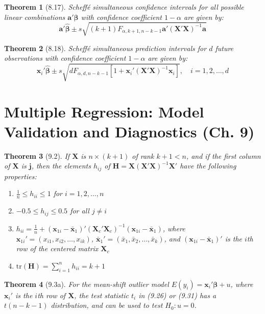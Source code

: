 \documentclass{article}
\newtheorem{theorem}{Theorem}[section]
\begin{document}
\begin{theorem}[8.17]
Scheffé simultaneous confidence intervals for all possible linear combinations $\mathbf{a}'\boldsymbol{\beta}$ with confidence coefficient $1-\alpha$ are given by:
\[\mathbf{a}'\hat{\boldsymbol{\beta}} \pm s\sqrt{(k+1)F_{\alpha,k+1,n-k-1}\mathbf{a}'(\mathbf{X}'\mathbf{X})^{-1}\mathbf{a}}\]
\end{theorem}

\begin{theorem}[8.18]
Scheffé simultaneous prediction intervals for $d$ future observations with confidence coefficient $1-\alpha$ are given by:
\[\mathbf{x}_i'\hat{\boldsymbol{\beta}} \pm s\sqrt{dF_{\alpha,d,n-k-1}[1 + \mathbf{x}_i'(\mathbf{X}'\mathbf{X})^{-1}\mathbf{x}_i]}, \quad i=1,2,\ldots,d\]
\end{theorem}

\section{Multiple Regression: Model Validation and Diagnostics (Ch. 9)}

\begin{theorem}[9.2]
If $\mathbf{X}$ is $n \times (k+1)$ of rank $k+1 < n$, and if the first column of $\mathbf{X}$ is $\mathbf{j}$, then the elements $h_{ij}$ of $\mathbf{H} = \mathbf{X}(\mathbf{X}'\mathbf{X})^{-1}\mathbf{X}'$ have the following properties:

\begin{enumerate}[label=(\roman*)]
\item $\frac{1}{n} \leq h_{ii} \leq 1$ for $i = 1,2,\ldots,n$
\item $-0.5 \leq h_{ij} \leq 0.5$ for all $j \neq i$
\item $h_{ii} = \frac{1}{n} + (\mathbf{x}_{1i} - \bar{\mathbf{x}}_1)'(\mathbf{X}_c'\mathbf{X}_c)^{-1}(\mathbf{x}_{1i} - \bar{\mathbf{x}}_1)$, where $\mathbf{x}_{1i}' = (x_{i1}, x_{i2},\ldots,x_{ik})$, $\bar{\mathbf{x}}_1' = (\bar{x}_1, \bar{x}_2,\ldots,\bar{x}_k)$, and $(\mathbf{x}_{1i} - \bar{\mathbf{x}}_1)'$ is the $i$th row of the centered matrix $\mathbf{X}_c$
\item $\text{tr}(\mathbf{H}) = \sum_{i=1}^n h_{ii} = k + 1$
\end{enumerate}
\end{theorem}

\begin{theorem}[9.3a]
For the mean-shift outlier model $E(y_i) = \mathbf{x}_i'\boldsymbol{\beta} + u$, where $\mathbf{x}_i'$ is the $i$th row of $\mathbf{X}$, the test statistic $t_i$ in (9.26) or (9.31) has a $t(n-k-1)$ distribution, and can be used to test $H_0: u = 0$.
\end{theorem}
\end{document}
